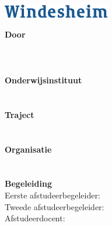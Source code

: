 \documentclass[10pt,a4paper,oneside]{report}
\title{\titel}
\author{\auteur}
\date{\datum}
\begin{document}
\begin{titlepage}
    \vspace*{-0.9cm}
    \hfill
    \includegraphics[width=0.35\textwidth]{windesheim} \\
    
    \begin{center}
    \vspace*{3cm}
    {\huge\thetitle}
    
    \vspace*{0.4cm}
    \textnormal{\ondertitel}
    \end{center}
    
    \raggedleft
    \vfill
    \textbf{Door} \\
    \theauthor \\
    \studentklas \\
    \mailstudent \\
    
    \vspace{\vertspace}
    \textbf{Onderwijsinstituut} \\
    \school \\
    \domein \\

    \vspace{\vertspace}
    \textbf{Traject} \\
    \voecode \\
    \perjaar \\
    
    \vspace{\vertspace}
    \textbf{Organisatie} \\
    \organisatie \\
    \mailorganisatie \\

    \vspace{\vertspace}
    \textbf{Begeleiding} \\
    Eerste afstudeerbegeleider: \begeleidereen \\
    Tweede afstudeerbegeleider: \begeleidertwee \\
    Afstudeerdocent: \docent \\
\end{titlepage}
\end{document}
